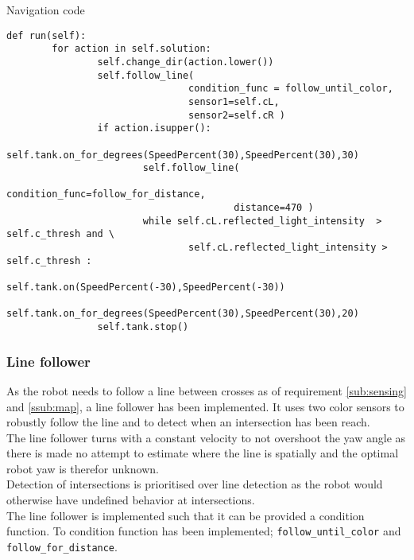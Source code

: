 \documentclass[../../main.tex]{subfiles}
\begin{document}
\begin{listing}[h]
	\caption{Navigation code}	
	\label{lst:nav}
	\begin{verbatim}
def run(self):
		for action in self.solution:
				self.change_dir(action.lower())
				self.follow_line(
								condition_func = follow_until_color,
								sensor1=self.cL,
								sensor2=self.cR )
				if action.isupper():
						self.tank.on_for_degrees(SpeedPercent(30),SpeedPercent(30),30)
						self.follow_line(
										condition_func=follow_for_distance,
										distance=470 )
						while self.cL.reflected_light_intensity  > self.c_thresh and \
								self.cL.reflected_light_intensity > self.c_thresh :
								self.tank.on(SpeedPercent(-30),SpeedPercent(-30))
						self.tank.on_for_degrees(SpeedPercent(30),SpeedPercent(30),20)
				self.tank.stop()
	\end{verbatim}
\end{listing}

\subsubsection{Line follower}%
\label{ssub:line_follower}

As the robot needs to follow a line between crosses as of requirement \ref{sub:sensing} and
\ref{ssub:map}, a line follower has been implemented.
It uses two color sensors to robustly follow the line and to detect
when an intersection has been reach.\\
The line follower turns with a constant velocity to not overshoot the yaw angle as
there is made no attempt to estimate where the line is spatially and the optimal robot
yaw is therefor unknown.\\
Detection of intersections is prioritised over line detection as the robot would otherwise
have undefined behavior at intersections.\\
The line follower is implemented such that it can be provided a condition function.
To condition function has been implemented; \texttt{follow_until_color} and
\texttt{follow_for_distance}.



	
\end{document}
